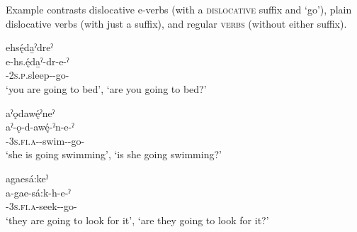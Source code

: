 Example  contrasts dislocative e-verbs (with a \textsc{dislocative} suffix and  ‘go’), plain dislocative verbs (with just a \textsc{\dislocative} suffix), and regular \textsc{verbs} (without either suffix).

\ea\label{ex:dislpurpfacex3}
\ea ehsę́da̱ˀdreˀ \\
\gll e-hs.ę́da̱ˀ-dr-e-ˀ\\
 {\factual}-\textsc{2s.p}.sleep-{\dislocative}-go-{\punctual}\\
\glt ‘you are going to bed’, `are you going to bed?'



\newpage
\ex aˀǫdawę́ˀneˀ \\
\gll aˀ-ǫ-d-awę́-ˀn-e-ˀ\\
 {\factual}-\textsc{3s.fi.a}-{\semireflexive}-swim-{\dislocative}-go-{\punctual}\\
\glt ‘she is going swimming’, `is she going swimming?'



\ex agaesá:keˀ \\
\gll a-gae-sá:k-h-e-ˀ\\
 {\factual}-\textsc{3s.fi.a}-seek-{\dislocative}-go-{\punctual}\\
\glt ‘they are going to look for it’, `are they going to look for it?'


